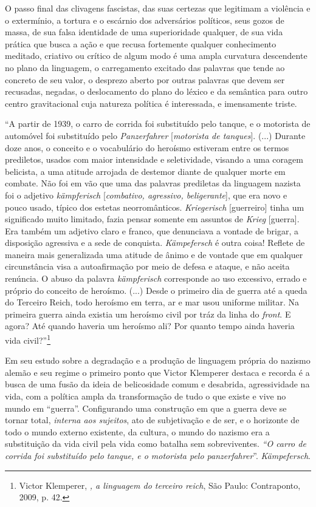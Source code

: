 O passo final das clivagens fascistas, das suas certezas que legitimam a
violência e o extermínio, a tortura e o escárnio dos adversários
políticos, seus gozos de massa, de sua falsa identidade de uma
superioridade qualquer, de sua vida prática que busca a ação e que
recusa fortemente qualquer conhecimento meditado, criativo ou crítico de
algum modo é uma ampla curvatura descendente no plano da linguagem, o
carregamento excitado das palavras que tende ao concreto de seu valor, o
desprezo aberto por outras palavras que devem ser recusadas, negadas, o
deslocamento do plano do léxico e da semântica para outro centro
gravitacional cuja natureza política é interessada, e imensamente
triste.

``A partir de 1939, o carro de corrida foi substituído pelo tanque, e o
motorista de automóvel foi substituído pelo \emph{Panzerfahrer}
{[}\emph{motorista de tanques}{]}. (...) Durante doze anos, o conceito e
o vocabulário do heroísmo estiveram entre os termos prediletos, usados
com maior intensidade e seletividade, visando a uma coragem belicista, a
uma atitude arrojada de destemor diante de qualquer morte em combate.
Não foi em vão que uma das palavras prediletas da linguagem nazista foi
o adjetivo \emph{kämpferisch} {[}\emph{combativo, agressivo,
beligerante}{]}, que era novo e pouco usado, típico dos estetas
neorromânticos. \emph{Kriegerisch} {[}guerreiro{]} tinha um significado
muito limitado, fazia pensar somente em assuntos de \emph{Krieg}
{[}guerra{]}. Era também um adjetivo claro e franco, que denunciava a
vontade de brigar, a disposição agressiva e a sede de conquista.
\emph{Kämpefersch} é outra coisa! Reflete de maneira mais generalizada
uma atitude de ânimo e de vontade que em qualquer circunstância visa a
autoafirmação por meio de defesa e ataque, e não aceita renúncia. O
abuso da palavra \emph{kämpferisch} corresponde ao uso excessivo, errado
e próprio do conceito de heroísmo. (...) Desde o primeiro dia de guerra
até a queda do Terceiro Reich, todo heroísmo em terra, ar e mar usou
uniforme militar. Na primeira guerra ainda existia um heroísmo civil por
tráz da linha do \emph{front}. E agora? Até quando haveria um heroísmo
ali? Por quanto tempo ainda haveria vida civil?''\footnote{Victor
  Klemperer, \emph{, a linguagem do terceiro reich}, São Paulo:
  Contraponto, 2009, p. 42.}

Em seu estudo sobre a degradação e a produção de linguagem própria do
nazismo alemão e seu regime o primeiro ponto que Victor Klemperer
destaca e recorda é a busca de uma fusão da ideia de belicosidade comum
e desabrida, agressividade na vida, com a política ampla da
transformação de tudo o que existe e vive no mundo em ``guerra''.
Configurando uma construção em que a guerra deve se tornar total,
\emph{interna aos sujeitos}, ato de subjetivação e de ser, e o horizonte
de todo o mundo externo existente, da cultura, o mundo do nazismo era a
substituição da vida civil pela vida como batalha sem sobreviventes.
\emph{``O carro de corrida foi substituído pelo tanque, e o motorista
pelo panzerfahrer}''. \emph{Kämpefersch}.

